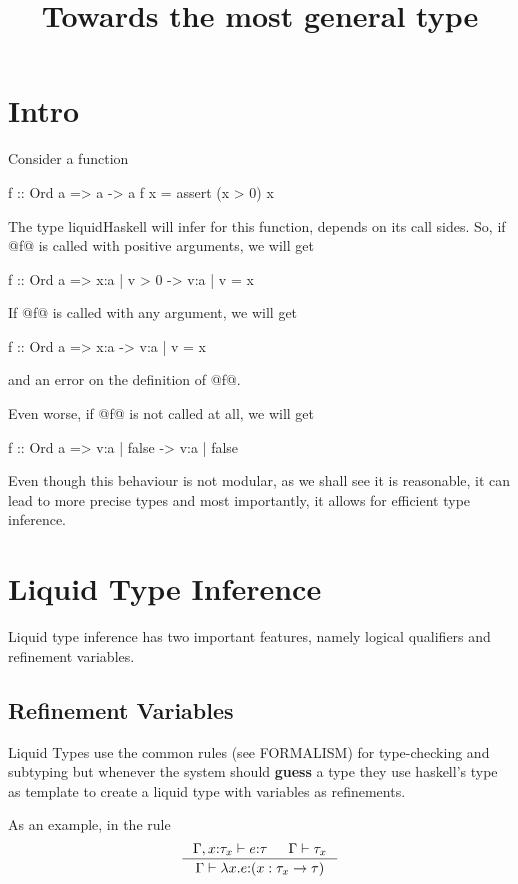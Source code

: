 \documentclass[10pt,a4paper]{article}
\title{Towards the most general type}
\newcommand\hastype[3]{\ensuremath{#1 \vdash #2 \colon #3}}
\newcommand\iswellformed[2]{\ensuremath{#1 \vdash #2}}
\begin{document}
\maketitle
\section*{Intro}
Consider a function 
\begin{code}
f :: Ord a => a -> a
f x = assert (x > 0) x
\end{code}

The type liquidHaskell will infer for this function, 
depends on its call sides.
%
So, if @f@ is called with positive arguments, 
we will get
\begin{code}
f :: Ord a => {x:a | v > 0} -> {v:a | v = x}
\end{code}

If @f@ is called with any argument, 
we will get
\begin{code}
f :: Ord a => x:a -> {v:a | v = x}
\end{code}
and an error on the definition of @f@.

Even worse, if @f@ is not called at all, 
we will get
\begin{code}
f :: Ord a => {v:a | false} -> {v:a | false}
\end{code}

Even though this behaviour is not modular,
as we shall see it is reasonable, 
it can lead to more precise types and
most importantly, it allows for 
efficient type inference.  

\section*{Liquid Type Inference}
Liquid type inference has two important features, 
namely logical qualifiers and refinement variables.

\subsection*{Refinement Variables}
Liquid Types use the common rules (see FORMALISM) for type-checking and subtyping 
but whenever the system should \textbf{guess} a type
they use haskell's type as template to create a liquid type with 
variables as refinements.

As an example, in the rule
$$
\inference{
	\hastype{\Gamma, x\colon\tau_x}{e}{\tau} &&
	\iswellformed{\Gamma}{\tau_x}
}{
	\hastype{\Gamma}{\lambda x . e}{(x:\tau_x \rightarrow \tau)}
}
$$
\end{document}

